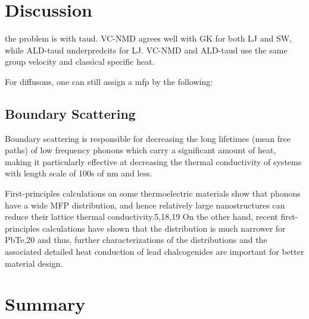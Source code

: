 \documentclass[aps,prb,twocolumn,superscriptaddress,preprintnumbers,amsmath,amssymb,floatfix]{revtex4}
\begin{document}
\section{\label{S:}Discussion}

the problem is with taud.  VC-NMD agrees well with GK for both LJ and SW, 
while ALD-taud underpredcits for LJ.  VC-NMD and ALD-taud use the same 
group velocity and classical specific heat.

For diffusons, one can still assign a mfp by the following:

\subsection{\label{S:}Boundary Scattering}
Boundary scattering is responsible for decreasing the long lifetimes 
(mean free paths) of low frequency phonons which carry a significant 
amount of heat, making it particularly effective at decreasing the 
thermal conductivity of systems with length scale of 100s of nm and 
less.\cite{mcgaughey_nanostructure_2012}

First-principles calculations on some thermoelectric
materials show that phonons have a wide MFP distribution,
and hence relatively large nanostructures can reduce their
lattice thermal conductivity.5,18,19 On the other hand, recent
first-principles calculations have shown that the distribution is
much narrower for PbTe,20 and thus, further characterizations
of the distributions and the associated detailed heat conduction
of lead chalcogenides are important for better material design.
\section{\label{S:}Summary}


\appendix
\end{document}
